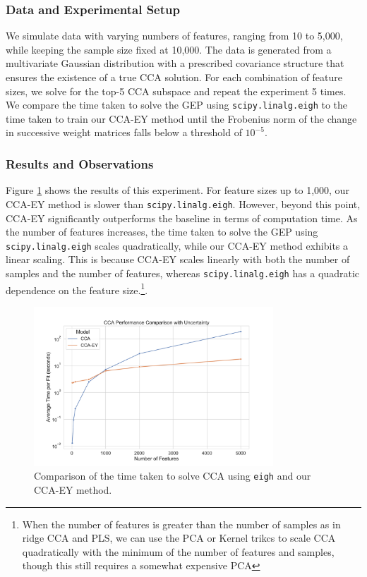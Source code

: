 \subsubsection{Data and Experimental Setup}
We simulate data with varying numbers of features, ranging from 10 to 5,000, while keeping the sample size fixed at 10,000. The data is generated from a multivariate Gaussian distribution with a prescribed covariance structure that ensures the existence of a true CCA solution.
For each combination of feature sizes, we solve for the top-5 CCA subspace and repeat the experiment 5 times. We compare the time taken to solve the GEP using \texttt{scipy.linalg.eigh} to the time taken to train our CCA-EY method until the Frobenius norm of the change in successive weight matrices falls below a threshold of $10^{-5}$.
\subsubsection{Results and Observations}
Figure \ref{fig:cca-comparison} shows the results of this experiment. For feature sizes up to 1,000, our CCA-EY method is slower than \texttt{scipy.linalg.eigh}. However, beyond this point, CCA-EY significantly outperforms the baseline in terms of computation time.
As the number of features increases, the time taken to solve the GEP using \texttt{scipy.linalg.eigh} scales quadratically, while our CCA-EY method exhibits a linear scaling. This is because CCA-EY scales linearly with both the number of samples and the number of features, whereas \texttt{scipy.linalg.eigh} has a quadratic dependence on the feature size.\footnote{When the number of features is greater than the number of samples as in ridge CCA and PLS, we can use the PCA or Kernel trikcs to scale CCA quadratically with the minimum of the number of features and samples, though this still requires a somewhat expensive PCA}.

\begin{figure}
    \centering
    \includegraphics[width=0.8\textwidth]{figures/benchmarks/cca_comparison_log}
    \caption{Comparison of the time taken to solve CCA using \texttt{eigh} and our CCA-EY method.}
    \label{fig:cca-comparison}
\end{figure}

